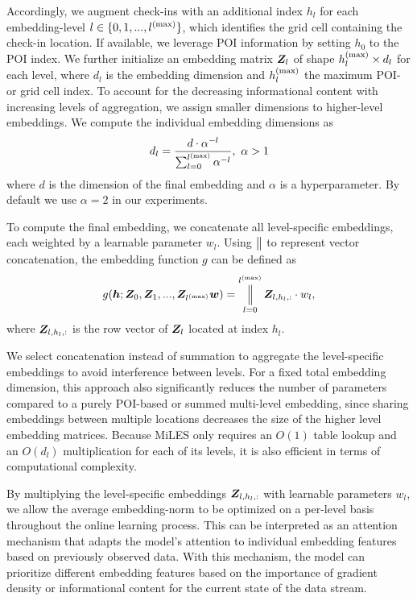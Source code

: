 \documentclass{article} %
\DeclareMathOperator*{\concat}{%
    \mathchoice%
        {\Big\Vert}%
        {\big\Vert}%
        {\Vert}%
        {\Vert}%
}
\theoremstyle{definition}
\begin{document}
Accordingly, we augment check-ins with an additional index $h_l$ for each embedding-level $l \in \{0, 1, ..., l^{(\rm{max})}\}$, which identifies the grid cell containing the check-in location.
If available, we leverage POI information by setting $h_0$ to the POI index.
We further initialize an embedding matrix ${\bm{Z}}_{l}$ of shape $h_l^{\rm{(max)}} \times d_l$ for each level, where $d_l$ is the embedding dimension and $h_l^{\rm{(max)}}$ the maximum POI- or grid cell index.
To account for the decreasing informational content with increasing levels of aggregation, we assign smaller dimensions to higher-level embeddings.
We compute the individual embedding dimensions as
\begin{equation}\label{eq:emb_dims}
    d_l=\frac{d \cdot \alpha^{-l}}{\sum_{l=0}^{l^{\rm{(max)}}} \alpha^{-l}}, \ \alpha > 1
\end{equation}
where $d$ is the dimension of the final embedding and $\alpha$ is a hyperparameter.
By default we use $\alpha=2$ in our experiments.

To compute the final embedding, we concatenate all level-specific embeddings, each weighted by a learnable parameter $w_l$.
Using $\concat$ to represent vector concatenation, the embedding function $g$ can be defined as
\begin{equation}
    g(\vh; \mZ_0, \mZ_1, ..., \mZ_{l^{\rm{(max)}}} \vw) = \concat_{l=0}^{l^{\rm{(max)}}} \mZ_{l,h_l,:} \cdot w_l,
\end{equation}
where ${\bm{Z}}_{l,h_l,:}$ is the row vector of ${\bm{Z}}_l$ located at index $h_l$.

We select concatenation instead of summation to aggregate the level-specific embeddings to avoid interference between levels.
For a fixed total embedding dimension, this approach also significantly reduces the number of parameters compared to a purely POI-based or summed multi-level embedding, since sharing embeddings between multiple locations decreases the size of the higher level embedding matrices.
Because MiLES only requires an $O(1)$ table lookup and an $O(d_l)$ multiplication for each of its levels, it is also efficient in terms of computational complexity.

By multiplying the level-specific embeddings ${\bm{Z}}_{l,h_l,:}$ with learnable parameters $w_l$, we allow the average embedding-norm to be optimized on a per-level basis throughout the online learning process.
This can be interpreted as an attention mechanism that adapts the model's attention to individual embedding features based on previously observed data.
With this mechanism, the model can prioritize different embedding features based on the importance of gradient density or informational content for the current state of the data stream.
\end{document}
